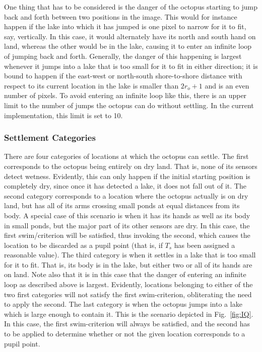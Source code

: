 One thing that has to be considered is the danger of the octopus
starting to jump back and forth between two positions in the image.
This would for instance happen if the lake into which it has jumped is
one pixel to narrow for it to fit, say, vertically.  In this case, it
would alternately have its north and south hand on land, whereas the
other would be in the lake, causing it to enter an infinite loop of
jumping back and forth.  Generally, the danger of this happening is
largest whenever it jumps into a lake that is too small for it to fit
in either direction; it is bound to happen if the east-west or
north-south shore-to-shore distance with respect to its current
location in the lake is smaller than $2r_{o}+1$ and is an even number
of pixels.  To avoid {\octopus} entering an infinite loop like this,
there is an upper limit to the number of jumps the octopus can do
without settling.  In the current implementation, this limit is set to
10.

\subsubsection{Settlement Categories}

There are four categories of locations at which the octopus can
settle.  The first corresponds to the octopus being entirely on dry
land.  That is, none of its sensors detect wetness.  Evidently, this
can only happen if the initial starting position is completely dry,
since once it has detected a lake, it does not fall out of it.  The
second category corresponds to a location where the octopus actually
is on dry land, but has all of its arms crossing small ponds at equal
distances from its body.  A special case of this scenario is when it
has its hands as well as its body in small ponds, but the major part
of its other sensors are dry.  In this case, the first swim/criterion
will be satisfied, thus invoking the second, which causes the location
to be discarded as a pupil point (that is, if $T_{s}$ has been
assigned a reasonable value).  The third category is when it settles
in a lake that is too small for it to fit.  That is, its body is in
the lake, but either two or all of its hands are on land.  Note also
that it is in this case that the danger of entering an infinite loop
as described above is largest.  Evidently, locations belonging to
either of the two first categories will not satisfy the first
swim-criterion, obliterating the need to apply the second.  The last
category is when the octopus jumps into a lake which is large enough
to contain it.  This is the scenario depicted in Fig.~\ref{fig:IQ}.
In this case, the first swim-criterion will always be satisfied, and
the second has to be applied to determine whether or not the given
location corresponds to a pupil point.

